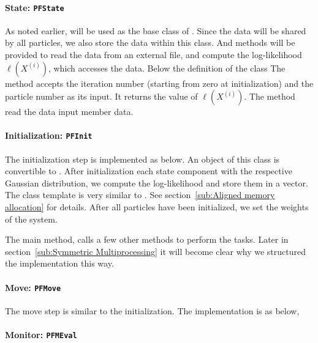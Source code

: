 \documentclass[11pt,bib,mint,hyper,altcolor]{marticle}
\begin{document}
\paragraph{State: \texttt{PFState}}

As noted earlier,  will be used as the base class of
. Since the data will be shared by all particles, we also
store the data within this class. And methods will be provided to read the data
from an external file, and compute the log-likelihood $\ell(X^{(i)})$, which
accesses the data. Below the definition of the class 
The method  accepts the iteration number (starting
from zero at initialization) and the particle number as its input. It returns
the value of $\ell(X^{(i)})$. The method  read the data
input member data.

\paragraph{Initialization: \texttt{PFInit}}

The initialization step is implemented as below.
An object of this class is convertible to
. After initialization each state
component with the respective Gaussian distribution, we compute the
log-likelihood and store them in a vector. The class template
 is very similar to . See
section~\ref{sub:Aligned memory allocation} for details. After all particles
have been initialized, we set the weights of the system.

The main method,  calls a few other methods to perform
the tasks. Later in section~\ref{sub:Symmetric Multiprocessing} it will become
clear why we structured the implementation this way.

\paragraph{Move: \texttt{PFMove}}

The move step is similar to the initialization. The implementation is as below,

\paragraph{Monitor: \texttt{PFMEval}}
\end{document}
